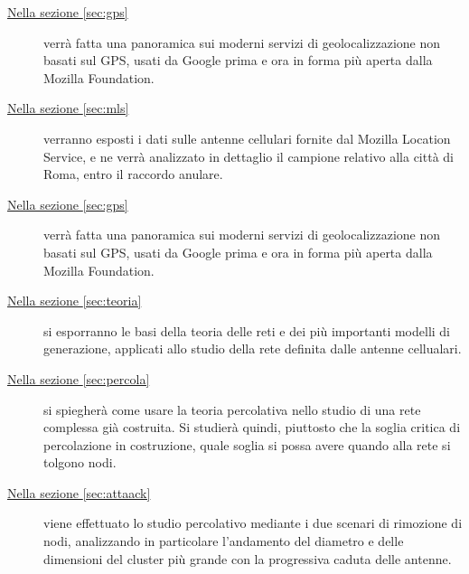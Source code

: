 \begin{description}
\item[{\hyperref[sec:gps]{Nella sezione \ref{sec:gps}}}] verrà fatta una panoramica sui moderni servizi di geolocalizzazione non basati sul GPS, usati da Google prima e ora in forma più aperta dalla Mozilla Foundation.

\item[{\hyperref[sec:mls]{Nella sezione \ref{sec:mls}}}] verranno esposti i dati sulle antenne cellulari fornite dal Mozilla Location Service, e ne verrà analizzato in dettaglio il campione relativo alla città di Roma, entro il raccordo anulare.

\item[{\hyperref[sec:gps]{Nella sezione \ref{sec:gps}}}] verrà fatta una panoramica sui moderni servizi di geolocalizzazione non basati sul GPS, usati da Google prima e ora in forma più aperta dalla Mozilla Foundation.

\item[{\hyperref[sec:teoria]{Nella sezione \ref{sec:teoria}}}] si esporranno le basi della teoria delle reti e dei più importanti modelli di generazione, applicati allo studio della rete definita dalle antenne cellualari. 

\item[{\hyperref[sec:percola]{Nella sezione \ref{sec:percola}}}] si spiegherà come usare la teoria percolativa nello studio di una rete complessa già costruita. Si studierà quindi, piuttosto che la soglia critica di percolazione in costruzione, quale soglia si possa avere quando alla rete si tolgono nodi.

\item[{\hyperref[sec:attaack]{Nella sezione \ref{sec:attaack}}}] viene effettuato lo studio percolativo mediante i due scenari di rimozione di nodi,  analizzando in particolare l'andamento del diametro e delle dimensioni del cluster più grande con la progressiva caduta delle antenne.

\end{description}